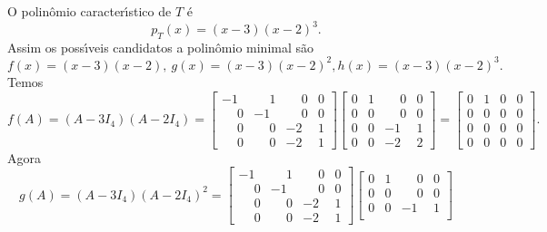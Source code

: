 \begin{exemplo}
\begin{enumerate}[label={\arabic*})]
        \begin{solucao}
            O polin\^omio caracter{\'\i}stico de $T$ \'e
            \[
                p_T(x) = (x - 3)(x - 2)^3.
            \]
            Assim os poss{\'\i}veis candidatos a polin\^omio minimal s\~ao
            \[
                f(x) = (x - 3)(x - 2), \ g(x) = (x -3)(x - 2)^2, h(x) = (x - 3)(x - 2)^3.
            \]
            Temos
            \[
                f(A) = (A - 3I_4)(A - 2I_4) = \begin{bmatrix}
                    -1 & \phantom{-}1 & \phantom{-}0 & 0\\
                    \phantom{-}0 & -1 & \phantom{-}0 & 0\\
                    \phantom{-}0 & \phantom{-}0 & -2 & 1\\
                    \phantom{-}0 & \phantom{-}0 & -2 & 1
                \end{bmatrix}
                \begin{bmatrix}
                    0 & 1 & \phantom{-}0 & 0\\
                    0 & 0 & \phantom{-}0 & 0\\
                    0 & 0 & -1 & 1\\
                    0 & 0 & -2 & 2
                \end{bmatrix} = \begin{bmatrix}
                    0 & 1 & 0 & 0\\
                    0 & 0 & 0 & 0\\
                    0 & 0 & 0 & 0\\
                    0 & 0 & 0 & 0
                \end{bmatrix}.
            \]
            Agora
            \[
                g(A) = (A - 3I_4)(A - 2I_4)^2 = \begin{bmatrix}
                    -1 & \phantom{-}1 & \phantom{-}0 & 0\\
                    \phantom{-}0 & -1 & \phantom{-}0 & 0\\
                    \phantom{-}0 & \phantom{-}0 & -2 & 1\\
                    \phantom{-}0 & \phantom{-}0 & -2 & 1
                \end{bmatrix}
                \begin{bmatrix}
                    0 & 1 & \phantom{-}0 & 0\\
                    0 & 0 & \phantom{-}0 & 0\\
                    0 & 0 & -1 & 1\\

\end{bmatrix}\]
\end{solucao}
\end{enumerate}
\end{exemplo}
